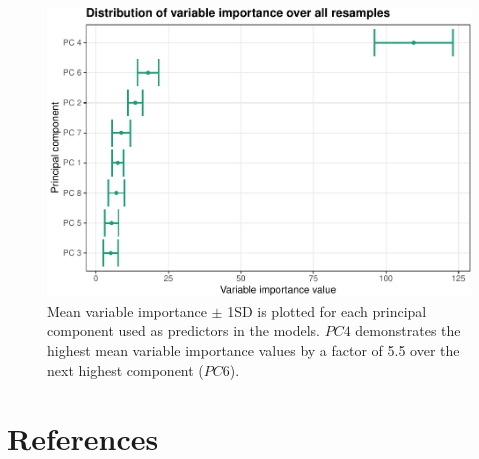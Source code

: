 \documentclass{article}
\begin{document}
\begin{figure}
\centering
\includegraphics{olet5610_report_files/figure-latex/impdists-1.pdf}
\caption{\label{fig:impdists}Mean variable importance \(\pm\) 1SD is plotted for each principal component used as predictors in the models. \(PC 4\) demonstrates the highest mean variable importance values by a factor of 5.5 over the next highest component (\(PC 6\)).}
\end{figure}

\hypertarget{references}{%
\section*{References}\label{references}}
\end{document}
